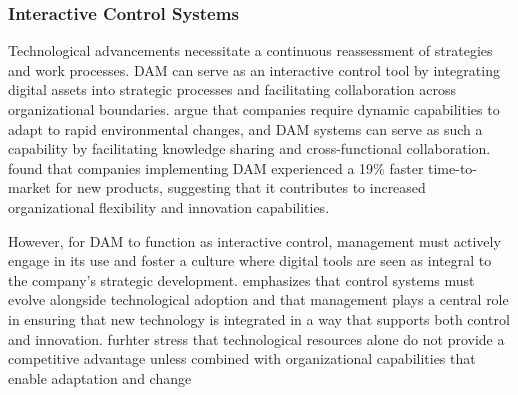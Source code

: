 \documentclass[a4paper,12pt,twocolumn]{article}
\begin{document}


\subsubsection{Interactive Control Systems}
Technological advancements necessitate a continuous reassessment of strategies and work processes. DAM can serve as an interactive control 
tool by integrating digital assets into strategic processes and facilitating collaboration across organizational boundaries.
\cite{teece1997} argue that companies require dynamic capabilities 
to adapt to rapid environmental changes, and DAM systems can serve as such a capability by facilitating knowledge sharing and cross-functional collaboration.
\cite{Mladenova2024} found that companies implementing DAM experienced a 19\% faster time-to-market for new products, 
suggesting that it contributes to increased organizational flexibility and innovation capabilities.

\vspace{0.3cm}
However, for DAM to function as interactive control, management must actively engage in its use and foster a culture where digital 
tools are seen as integral to the company’s strategic development. 
\cite{simons1995} emphasizes that control systems must evolve alongside technological adoption and that management plays a central 
role in ensuring that new technology is integrated in a way that supports both control and innovation. 
 \cite{eisenhardt2000} furhter stress that technological resources alone do not provide a competitive advantage
 unless combined with organizational capabilities that enable adaptation and change
\end{document}
